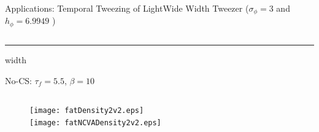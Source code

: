 \begin{frame}[c]{Applications: Temporal Tweezing of Light}{\textcolor{paleblue}{Wide Width Tweezer} ($\sigma_\phi = 3$ and $h_\phi  = 6.9949$ )}
\begin{columns}
\begin{column}{0.75\textwidth}
\hrule width\textwidth 

\vspace{0.5em}
{\small No-CS:  $\tau_f =5.5$, $\beta = 10$ }
\begin{columns}
\begin{column}{0.5\textwidth}
\centering
\vspace{-1em}
\begin{figure}
\hspace{2em}\texttt{[image: fatDensity2v2.eps]}  \\
\vspace{-0.5em}
\hspace{2em}\texttt{[image: fatNCVADensity2v2.eps]} 
\end{figure}
\end{column}
\begin{column}{0.5\textwidth}
\vspace{-0.5em} \raggedright
\hspace{-2em}%
\end{column}
\end{columns}
\end{column}
\end{columns}
\end{frame}


